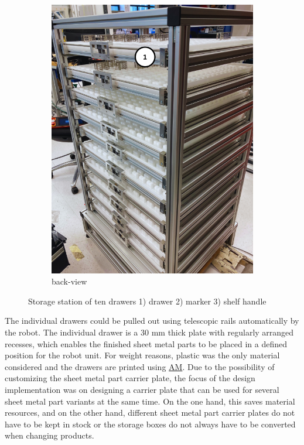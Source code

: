 \begin{figure}[h]
\begin{subfigure}{0.35\textwidth}
        \label{fig:storage-station-front}
    \end{subfigure}\hspace{1cm}
    \begin{subfigure}{0.36\textwidth}
        \centering
        \includegraphics[width=\textwidth]{figures/storage-station-back.png} %
        \caption{back-view}
        \label{fig:storage-station-back}
    \end{subfigure}
    \caption{Storage station of ten drawers 1) drawer 2) marker 3) shelf handle}
    \label{fig:storage-station-main}
\end{figure}

The individual drawers could be pulled out using
telescopic rails automatically by the robot. 
The individual drawer is a 30 mm thick plate with regularly arranged recesses,
which enables the finished sheet metal parts to be placed in a defined position for the robot unit. For
weight reasons, plastic was the only material considered and the drawers are printed using \hyperref[acro:AM]{AM}.
Due to the possibility of customizing the sheet metal part carrier plate, the
focus of the design implementation was on designing a carrier plate that can be used for several sheet
metal part variants at the same time. On the one hand, this saves material resources, and on the other
hand, different sheet metal part carrier plates do not have to be kept in stock or the storage boxes do
not always have to be converted when changing products.


